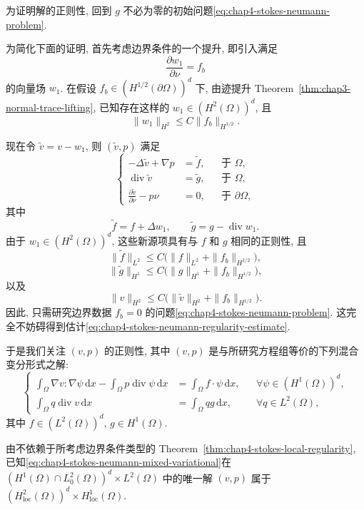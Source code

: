 为证明解的正则性, 回到 $g$ 不必为零的初始问题\eqref{eq:chap4-stokes-neumann-problem}.

为简化下面的证明, 首先考虑边界条件的一个提升, 即引入满足
\[
 \frac{\partial w_1}{\partial\nu}=f_b
\]
的向量场 $w_1$. 在假设 $f_b\in(H^{1/2}(\partial\Omega))^d$ 下, 由迹提升 Theorem~\ref{thm:chap3-normal-trace-lifting}, 已知存在这样的 $w_1\in(H^2(\Omega))^d$, 且
\[
 \|w_1\|_{H^2}\leq C\|f_b\|_{H^{1/2}}.
\]

现在令 $\widetilde v=v-w_1$, 则 $(\widetilde v,p)$ 满足
\[
 \left\{
 \begin{aligned}
  -\Delta\widetilde v+\nabla p&=\widetilde f,&&\text{于 }\Omega,\\
  \operatorname{div}\widetilde v&=\widetilde g,&&\text{于 }\Omega,\\
  \frac{\partial\widetilde v}{\partial\nu}-p\nu&=0,&&\text{于 }\partial\Omega,
 \end{aligned}
 \right.
\]
其中
\[
 \widetilde f=f+\Delta w_1,
 \qquad
 \widetilde g=g-\operatorname{div}w_1.
\]
由于 $w_1\in(H^2(\Omega))^d$, 这些新源项具有与 $f$ 和 $g$ 相同的正则性, 且
\[
 \|\widetilde f\|_{L^2}\leq C\bigl(\|f\|_{L^2}+\|f_b\|_{H^{1/2}}\bigr),
\]
\[
 \|\widetilde g\|_{H^1}\leq C\bigl(\|g\|_{H^1}+\|f_b\|_{H^{1/2}}\bigr),
\]
以及
\[
 \|v\|_{H^2}\leq C\bigl(\|\widetilde v\|_{H^2}+\|f_b\|_{H^{1/2}}\bigr).
\]
因此, 只需研究边界数据 $f_b=0$ 的问题\eqref{eq:chap4-stokes-neumann-problem}. 这完全不妨碍得到估计\eqref{eq:chap4-stokes-neumann-regularity-estimate}.

于是我们关注 $(v,p)$ 的正则性, 其中 $(v,p)$ 是与所研究方程组等价的下列混合变分形式之解:
\begin{equation}
 \left\{
 \begin{aligned}
  \int_\Omega\nabla v:\nabla\psi\,\mathrm dx
  -\int_\Omega p\operatorname{div}\psi\,\mathrm dx
  &=\int_\Omega f\cdot\psi\,\mathrm dx,
  &&\forall\psi\in(H^1(\Omega))^d,\\
  \int_\Omega q\operatorname{div}v\,\mathrm dx
  &=\int_\Omega qg\,\mathrm dx,
  &&\forall q\in L^2(\Omega),
 \end{aligned}
 \right.
 \label{eq:chap4-stokes-neumann-mixed-variational}
\end{equation}
其中 $f\in(L^2(\Omega))^d$, $g\in H^1(\Omega)$.

由不依赖于所考虑边界条件类型的 Theorem~\ref{thm:chap4-stokes-local-regularity}, 已知\eqref{eq:chap4-stokes-neumann-mixed-variational}在 $(H^1(\Omega)\cap L_0^2(\Omega))^d\times L^2(\Omega)$ 中的唯一解 $(v,p)$ 属于 $(H_{\mathrm{loc}}^2(\Omega))^d\times H_{\mathrm{loc}}^1(\Omega)$.

